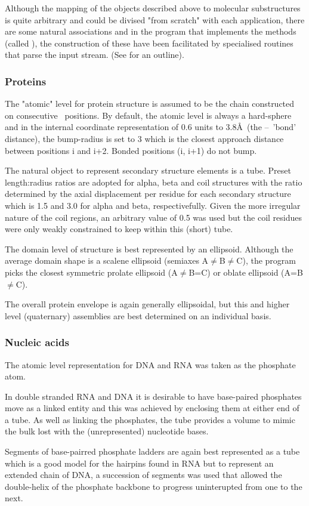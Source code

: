 Although the mapping of the objects described above to molecular substructures is quite
arbitrary and could be divised "from scratch" with each application, there are some
natural associations and in the program that implements the methods (called \NAME),
the construction of these have been facilitated by specialised routines that parse
the input stream. (See \cite{} for an outline).

\subsubsection{Proteins}

The "atomic" level for protein structure is assumed to be the chain constructed on
consecutive \CA\ positions.   By default, the atomic level is always a hard-sphere
and in the internal coordinate representation of 0.6 units to 3.8\AA\ (the \CA--\CA\
'bond' distance), the bump-radius is set to 3 which is the closest approach distance 
between positions i and i+2.   Bonded positions (i, i+1) do not bump.  

The natural object to represent secondary structure elements is a tube.   Preset
length:radius ratios are adopted for alpha, beta and coil structures with the ratio
determined by the axial displacement per residue for each secondary structure which
is 1.5 and 3.0 for alpha and beta, respectivefully.   Given the more irregular nature
of the coil regions, an arbitrary value of 0.5 was used but the coil residues were
only weakly constrained to keep within this (short) tube.

The domain level of structure is best represented by an ellipsoid.   Although the
average domain shape is a scalene ellipsoid (semiaxes A$\ne$B$\ne$C), the program picks
the closest symmetric prolate ellipsoid (A$\ne$B=C) or oblate ellipsoid (A=B$\ne$C).

The overall protein envelope is again generally ellipsoidal, but this and higher
level (quaternary) assemblies are best determined on an individual basis.

\subsubsection{Nucleic acids}

The atomic level representation for DNA and RNA was taken as the phosphate atom.

In double stranded RNA and DNA it is desirable to have base-paired phosphates
move as a linked entity and this was achieved by enclosing them at either end of
a tube.  As well as linking the phosphates, the tube provides a volume to mimic
the bulk lost with the (unrepresented) nucleotide bases.

Segments of base-pairred phosphate ladders are again best represented as a tube
which is a good model for the hairpins found in RNA but to represent an extended
chain of DNA, a succession of segments was used that allowed the double-helix
of the phosphate backbone to progress uninterupted from one to the next.
